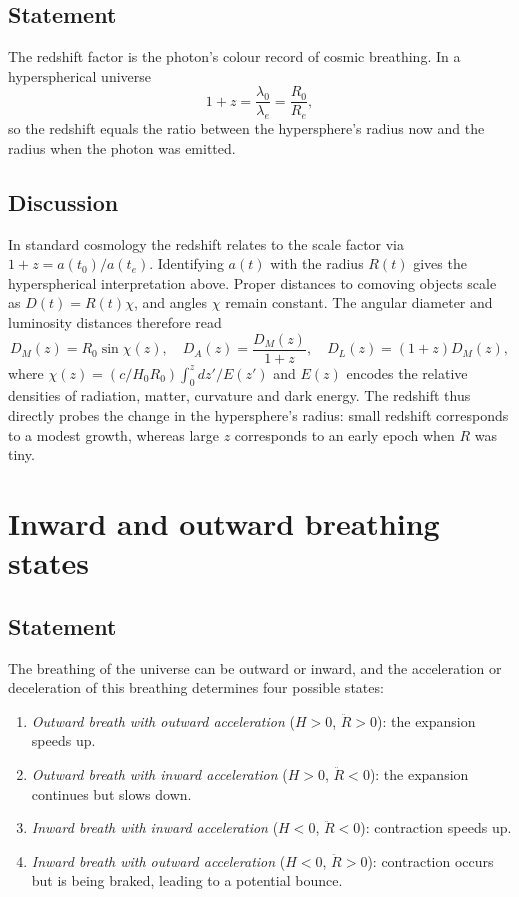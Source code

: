\documentclass{article}
\begin{document}
\subsection{Statement}
The redshift factor is the photon’s colour record of cosmic breathing.  In a hyperspherical universe
\[
1+z = \frac{\lambda_0}{\lambda_e} = \frac{R_0}{R_e},
\]
so the redshift equals the ratio between the hypersphere’s radius now and the radius when the photon was emitted.

\subsection{Discussion}
In standard cosmology the redshift relates to the scale factor via $1+z = a(t_0)/a(t_e)$.  Identifying $a(t)$ with the radius $R(t)$ gives the hyperspherical interpretation above.  Proper distances to comoving objects scale as $D(t)=R(t)\chi$, and angles $\chi$ remain constant.  The angular diameter and luminosity distances therefore read
\[
D_M(z)=R_0 \sin\chi(z), \quad D_A(z)=\frac{D_M(z)}{1+z}, \quad D_L(z)=(1+z)D_M(z),
\]
where $\chi(z)= (c/H_0 R_0) \int_0^z \!dz'/E(z')$ and $E(z)$ encodes the relative densities of radiation, matter, curvature and dark energy.  The redshift thus directly probes the change in the hypersphere’s radius: small redshift corresponds to a modest growth, whereas large $z$ corresponds to an early epoch when $R$ was tiny.

\section{Inward and outward breathing states}
\label{sec:states}
\subsection{Statement}
The breathing of the universe can be outward or inward, and the acceleration or deceleration of this breathing determines four possible states:
\begin{enumerate}
\item \emph{Outward breath with outward acceleration} ($H>0$, $\ddot{R}>0$): the expansion speeds up.
\item \emph{Outward breath with inward acceleration} ($H>0$, $\ddot{R}<0$): the expansion continues but slows down.
\item \emph{Inward breath with inward acceleration} ($H<0$, $\ddot{R}<0$): contraction speeds up.
\item \emph{Inward breath with outward acceleration} ($H<0$, $\ddot{R}>0$): contraction occurs but is being braked, leading to a potential bounce.
\end{enumerate}
\end{document}

